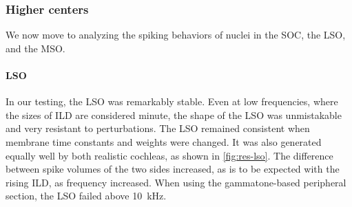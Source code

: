 \documentclass[11pt,a4paper]{article}
\begin{document}
\subsubsection{Higher centers}
We now move to analyzing the spiking behaviors of nuclei in the SOC, the LSO, and the MSO. 

\paragraph{LSO}
In our testing, the LSO was remarkably stable. Even at low frequencies, where the sizes of ILD are considered minute, the shape of the LSO was unmistakable and very resistant to perturbations. The LSO remained consistent when membrane time constants and weights were changed. It was also generated equally well by both realistic cochleas, as shown in \ref{fig:res-lso}. The difference between spike volumes of the two sides increased, as is to be expected with the rising ILD, as frequency increased. When using the gammatone-based peripheral section, the LSO failed above \qty{10}{\kilo\hertz}.
\end{document}
